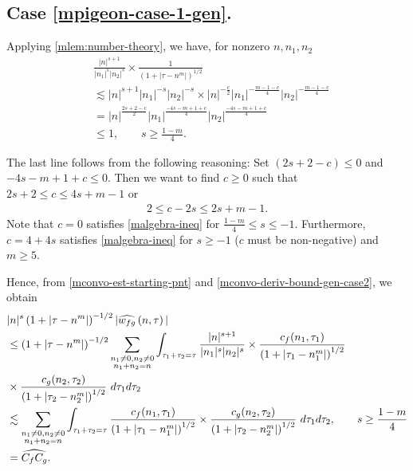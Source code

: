 \subsection{Case \texorpdfstring{\eqref{mpigeon-case-1-gen}}{1}.}
Applying \cref{mlem:number-theory}, we have, for nonzero $ n, n_1, n_2 $
%
\begin{equation}
	\label{mconvo-deriv-bound-gen-case2}
	\begin{split}
		& \frac{|n|^{s+1}}{|n_1|^s 
		| n_2|^s}
		\times
		\frac{1}{(1 + | \tau -n^m |)^{1/2}}
		\\
		& \lesssim | n |^{s+1}| n_1 |^{-s}| n_2 |^{-s} \times | n
		|^{-\frac{c}{2}}| n_1 |^{-\frac{m-1-c}{4}}| n_2 |^{-\frac{m-1-c}{4}} 
		\\
		& = | n |^{\frac{2s+2 -c}{2}} | n_1 |^{\frac{-4s -m + 1+ c}{4}} | n_2
		|^\frac{-4s -m + 1+ c}{4}
		\\
		& \le 1, \qquad s \ge \frac{1-m}{4}.
	\end{split}  
\end{equation}
%
%
\begin{framed}
\begin{remark}
	\label{mrem:gen-s-val}
	 The last line follows from the following reasoning: Set $(2s + 2 -c) \le
0$ and $-4s -m +1 +c \le 0$. Then we want to find $c \ge 0$ such that $2s +2 \le c \le
4s + m-1$ or 
%
%
\begin{equation}
	\label{malgebra-ineq}
	\begin{split}
		2 \le c - 2s \le 2s + m-1.
	\end{split}
\end{equation}
%
%
Note that $c=0$ satisfies \eqref{malgebra-ineq} for $\frac{1-m}{4} \le s \le
-1$. Furthermore, $c = 4 + 4s$ satisfies \eqref{malgebra-ineq} for $s \ge -1$ ($c$ must be non-negative) and $m \ge 5$. 
\end{remark}
\end{framed}
%
Hence, from \eqref{mconvo-est-starting-pnt} and
\eqref{mconvo-deriv-bound-gen-case2},
we obtain 
\begin{equation}
	\label{mconvo-est-starting-pnt-gen-case2}
	\begin{split}
		 & |n|^s \left( 1 + | \tau - n^m | \right)^{-1/2} | \widehat{w_{fg}}\left( 
		n, \tau \right) |
		\\
		& \le \left( 1 + | \tau - n^m | \right)^{-1/2}
		\sum_{\substack{n_1 \neq0, n_2 \neq 0 \\n_1 + n_2 =n}} \int_{\tau_1 + \tau_2 = \tau}\frac{|n|^{s+1}}{|n_1|^s | n_2|^s} 
		\times \frac{c_f(n_1, \tau_1)}{\left( 1 + | \tau_1 - n_1^m | 
		\right)^{1/2}}
		\\
		& \times
		\frac{c_g(n_2, \tau_2)}{\left( 1 + | \tau_2 - n_2^m | 
		\right)^{1/2}}\ d \tau_1 d \tau_2
		\\
		& \lesssim \sum_{\substack{n_1 \neq0, n_2 \neq 0 \\n_1 + n_2 =n}} \int_{\tau_1 + \tau_2 = \tau}\frac{c_f(n_1, \tau_1)}{\left( 1 + | \tau_1 - n_1^m | 
		\right)^{1/2}} \times
		\frac{c_g(n_2, \tau_2)}{\left( 1 + | \tau_2 - n_2^m | 
		\right)^{1/2}}\ d \tau_1 d \tau_2, \qquad s \ge \frac{1-m}{4}
		\\
		& = \widehat{{C_f} C_g}.
	\end{split}
\end{equation}
